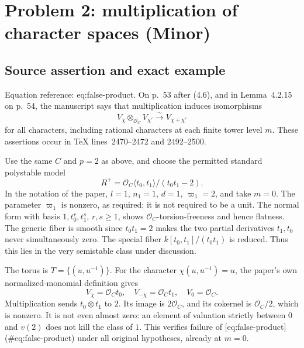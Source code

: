 \documentclass[10pt]{article}
\begin{document}
\section*{Problem 2: multiplication of character spaces (Minor)}
\subsection*{Source assertion and exact example}
Equation reference: eq:false-product. On p. 53 after (4.6), and in Lemma 4.2.15 on p. 54, the manuscript says that multiplication induces isomorphisms \[
V_\chi\otimes_{\mathcal O_C}V_{\chi'}\xrightarrow{\sim}V_{\chi+\chi'}\] for all characters, including rational characters at each finite tower level \(m\). These assertions occur in TeX lines 2470–2472 and 2492–2500.\par
Use the same \(C\) and \(p=2\) as above, and choose the permitted standard polystable model \[R^+=\mathcal O_C\langle t_0,t_1\rangle/(t_0t_1-2).\] In the notation of the paper, \(l=1\), \(n_1=1\), \(d=1\), \(\varpi_1=2\), and take \(m=0\). The parameter \(\varpi_1\) is nonzero, as required; it is not required to be a unit. The normal form with basis \(1,t_0^r,t_1^s\), \(r,s\geq1\), shows \(\mathcal O_C\)-torsion-freeness and hence flatness. The generic fiber is smooth since \(t_0t_1=2\) makes the two partial derivatives \(t_1,t_0\) never simultaneously zero. The special fiber \(k[t_0,t_1]/(t_0t_1)\) is reduced. Thus this lies in the very semistable class under discussion.\par
The torus is \(T=\{(u,u^{-1})\}\). For the character \(\chi(u,u^{-1})=u\), the paper’s own normalized-monomial definition gives \[V_\chi=\mathcal O_Ct_0,\quad V_{-\chi}=\mathcal O_Ct_1,\quad V_0=\mathcal O_C.\] Multiplication sends \(t_0\otimes t_1\) to \(2\). Its image is \(2\mathcal O_C\), and its cokernel is \(\mathcal O_C/2\), which is nonzero. It is not even almost zero: an element of valuation strictly between \(0\) and \(v(2)\) does not kill the class of \(1\). This verifies failure of [eq:false-product] (\#eq:false-product) under all original hypotheses, already at \(m=0\).\par
\end{document}
